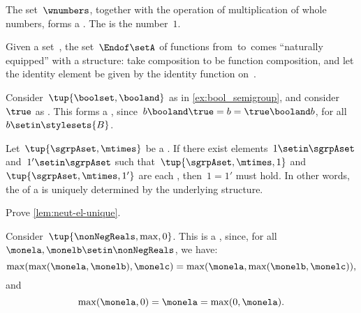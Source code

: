 \begin{example}
    The set~$\wnumbers$, together with the operation of multiplication of whole numbers, forms a .
    The  is the number~$1$.
\end{example}

\begin{example}
    Given a set~\setA, the set~$\Endof\setA$ of functions from~\setA to~\setA comes ``naturally equipped'' with a  structure: take  composition to be function composition, and let the identity element be given by the identity function on~\setA.
\end{example}

\begin{example}
    \label{ex:bool_monoid}
    Consider~$\tup{\boolset,\booland}$ as in \cref{ex:bool_semigroup}, and consider~$\true$ as .
    This forms a , since~$b\booland \true=b=\true \booland b$, for all~$b\setin \stylesets{B}$.
\end{example}

\begin{lemma}
    \label{lem:neut-el-unique}
    Let~$\tup{\sgrpAset, \mtimes}$ be a .
    If there exist elements~$1 \setin \sgrpAset$ and~$1' \setin \sgrpAset$ such that~$\tup{\sgrpAset, \mtimes, 1}$ and~$\tup{\sgrpAset, \mtimes, 1'}$ are each , then~$1 = 1'$ must hold.
    In other words, the  of a  is uniquely determined by the underlying  structure.
\end{lemma}

\begin{gradedexercise}
    \label{ex:UniqueNeutralMonoid}
    Prove \cref{lem:neut-el-unique}.
\end{gradedexercise}


\begin{example}
    Consider~$\tup{\nonNegReals,\max,0}$.
    This is a , since, for all~$\monela,\monelb\setin \nonNegReals$, we have:
    \begin{equation}
        \max(\max(\monela,\monelb),\monelc)=\max(\monela,\max(\monelb,\monelc)),
    \end{equation}
    and
    \begin{equation}
        \max(\monela,0)=\monela=\max(0,\monela).
    \end{equation}
\end{example}

